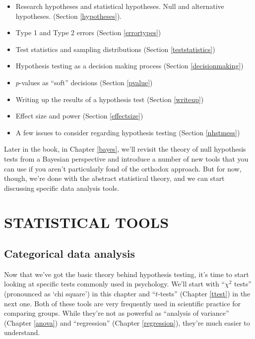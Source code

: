 \documentclass[
  11pt,
  a4paper,
  twoside,symmetric,openright]{book}
\providecommand{\tightlist}{%
  \setlength{\itemsep}{0pt}\setlength{\parskip}{0pt}}
\theoremstyle{break}
\theoremstyle{break}
\begin{document}
\begin{itemize}
\tightlist
\item
  Research hypotheses and statistical hypotheses. Null and alternative hypotheses. (Section \ref{hypotheses}).
\item
  Type 1 and Type 2 errors (Section \ref{errortypes})
\item
  Test statistics and sampling distributions (Section \ref{teststatistics})
\item
  Hypothesis testing as a decision making process (Section \ref{decisionmaking})
\item
  \(p\)-values as ``soft'' decisions (Section \ref{pvalue})
\item
  Writing up the results of a hypothesis test (Section \ref{writeup})
\item
  Effect size and power (Section \ref{effectsize})
\item
  A few issues to consider regarding hypothesis testing (Section \ref{nhstmess})
\end{itemize}

Later in the book, in Chapter \ref{bayes}, we'll revisit the theory of null hypothesis tests from a Bayesian perspective and introduce a number of new tools that you can use if you aren't particularly fond of the orthodox approach. But for now, though, we're done with the abstract statistical theory, and we can start discussing specific data analysis tools.

\part*{STATISTICAL TOOLS}\label{part-statistical-tools}

\chapter{Categorical data analysis}\label{chisquare}

Now that we've got the basic theory behind hypothesis testing, it's time to start looking at specific tests commonly used in psychology. We'll start with ``\(\chi^2\) tests'' (pronounced as `chi square') in this chapter and ``\(t\)-tests'' (Chapter \ref{ttest}) in the next one. Both of these tools are very frequently used in scientific practice for comparing groups. While they're not as powerful as ``analysis of variance'' (Chapter \ref{anova}) and ``regression'' (Chapter \ref{regression}), they're much easier to understand.
\end{document}
